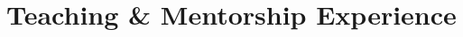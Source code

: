 \documentclass[10pt,letterpaper,sans]{moderncv}        %
\newcommand\x{1}
\newcommand\y{4}
\begin{document}




\section{Teaching \& Mentorship Experience}

\vspace{\x pt}
\end{document}
